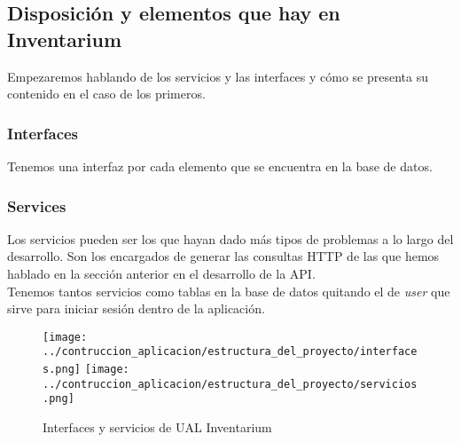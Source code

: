 \subsection{Disposición y elementos que hay en Inventarium}
Empezaremos hablando de los servicios y las interfaces y cómo se presenta su contenido en el caso de los primeros.

\subsubsection{Interfaces}
Tenemos una interfaz por cada elemento que se encuentra en la base de datos.

\subsubsection{Services}
Los servicios pueden ser los que hayan dado más tipos de problemas a lo largo del desarrollo. Son los encargados de generar las consultas HTTP de las que hemos hablado en la sección anterior en el desarrollo de la API.
\\Tenemos tantos servicios como tablas en la base de datos quitando el de \textit{user} que sirve para iniciar sesión dentro de la aplicación.

\begin{figure}[h]
    \centering
    \texttt{[image: ../contruccion\_aplicacion/estructura\_del\_proyecto/interfaces.png]}
    \texttt{[image: ../contruccion\_aplicacion/estructura\_del\_proyecto/servicios.png]}
    \caption{Interfaces y servicios de UAL Inventarium}
\end{figure}

